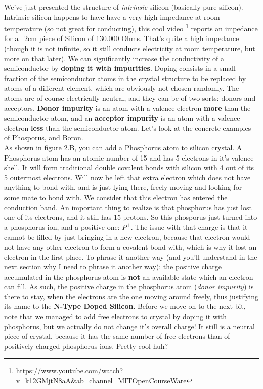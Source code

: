 We've just presented the structure of \textit{intrinsic} silicon (basically pure silicon). Intrinsic silicon happens to have have a very high impedance at room temperature (so not great for conducting), this cool video \footnote{https://www.youtube.com/watch?v=k12GMjtN8aA&ab_channel=MITOpenCourseWare} reports an impedance for a ~2cm piece of Silicon of 130.000 Ohms. That's quite a high impedance (though it is not infinite, so it still conducts electricity at room temperature, but more on that later). We can significantly increase the conductivity of a semiconductor by \textbf{doping it with impurities}. Doping consists in a small fraction of the semiconductor atoms in the crystal structure to be replaced by atoms of a different element, which are obviously not chosen randomly. The atoms are of course electrically neutral, and they can be of two sorts: donors and acceptors. \textbf{Donor impurity} is an atom with a valence electron \textbf{more} than the semiconductor atom, and an \textbf{acceptor impurity} is an atom with a valence electron \textbf{less} than the semiconductor atom. Let's look at the concrete examples of Phosporus, and Boron. \\

As shown in figure 2.B, you can add a Phosphorus atom to silicon crystal. A Phosphorus atom has an atomic number of 15 and has 5 electrons in it's valence shell. It will form traditional double covalent bonds with silicon with 4 out of its 5 outermost electrons. Will now be left that extra electron which does not have anything to bond with, and is just lying there, freely moving and looking for some mate to bond with. We consider that this electron has entered the conduction band. An important thing to realize is that phosphorus has just lost one of its electrons, and it still has 15 protons. So this phosporus just turned into a phosphorus ion, and a positive one: $P^+$. The issue with that charge is that it cannot be filled by just bringing in a new electron, because that electron would not have any other electron to form a covalent bond with, which is why it lost an electron in the first place. To phrase it another way (and you'll understand in the next section why I need to phrase it another way): the positive charge accumulated in the phosphorus atom is \textbf{not} an available state which an electron can fill. As such, the positive charge in the phosphorus atom (\textit{donor impurity}) is there to stay, when the electrons are the one moving around freely, thus justifying its name to the \textbf{N-Type Doped Silicon}. Before we move on to the next bit, note that we managed to add free electrons to crystal by doping it with phosphorus, but we actually do not change it's overall charge! It still is a neutral piece of crystal, because it has the same number of free electrons than of positively charged phosphorus ions. Pretty cool huh? \\

